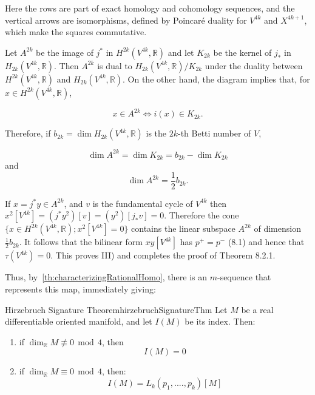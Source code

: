 \documentclass{book}
\newcommand{\R}{{\mathbb{R}}}
\renewcommand{\mod}{\,\operatorname{mod}\,}
\begin{document}
\begin{Proof}
Here the rows are part of exact homology and cohomology sequences, and the vertical arrows are isomorphisms, defined by {\color{red} Poincaré} duality for $V^{4k}$ and $X^{4k+1}$, which make the squares commutative.

Let $A^{2k}$ be the image of $j^*$ in $H^{2k}(V^{4k}, \mathbb{R})$ and let $K_{2k}$ be the kernel of $j_*$ in $H_{2k}(V^{4k}, \mathbb{R})$. Then $A^{2k}$ is dual to $H_{2k}(V^{4k}, \mathbb{R})/K_{2k}$ under the duality between $H^{2k}(V^{4k}, \mathbb{R})$ and $H_{2k}(V^{4k}, \mathbb{R})$. On the other hand, the diagram implies that, for $x \in H^{2k}(V^{4k}, \mathbb{R})$,

\[
    x \in A^{2k} \Leftrightarrow i(x) \in K_{2k}.
\]

Therefore, if $b_{2k} = \dim H_{2k}(V^{4k}, \mathbb{R})$ is the $2k$-th {\color{red} Betti} number of $V$,

\[
    \dim A^{2k} = \dim K_{2k} = b_{2k} - \dim K_{2k}
\]
and
\[
    \dim A^{2k} = \frac{1}{2}b_{2k}.
\]

If $x = j^* y \in A^{2k}$, and $v$ is the fundamental cycle of $V^{4k}$ then $x^2[V^{4k}] = (j^* y^2)[v] = (y^2)[j_* v] = 0$. Therefore the cone $\{x \in H^{2k}(V^{4k}, \mathbb{R}); x^2[V^{4k}] = 0\}$ contains the linear subspace $A^{2k}$ of dimension $\frac{1}{2}b_{2k}$. It follows that the bilinear form $x y[V^{4k}]$ has $p^+ = p^-$ (8.1) and hence that $\tau(V^{4k}) = 0$. This proves III) and completes the proof of Theorem 8.2.1.


\end{Proof}


%

Thus, by~\cref{th:characterizingRationalHomo}, there is an $m$-sequence that represents this map, immediately
giving:

\begin{thm}{Hirzebruch Signature Theorem}{hirzebruchSignatureThm}
  Let $M$ be a real differentiable oriented manifold, and let $I(M)$ be its index. Then:
  \begin{enumerate}
    \item if $\dim_\R M\not\equiv 0\mod 4$, then
      \[
        I(M) = 0
      \]
    \item if $\dim_\R M\equiv 0\mod 4$, then:
      \[
        I(M) = L_k(p_1, ...., p_k)[M]
      \]
  \end{enumerate}
\end{thm}
\end{document}
